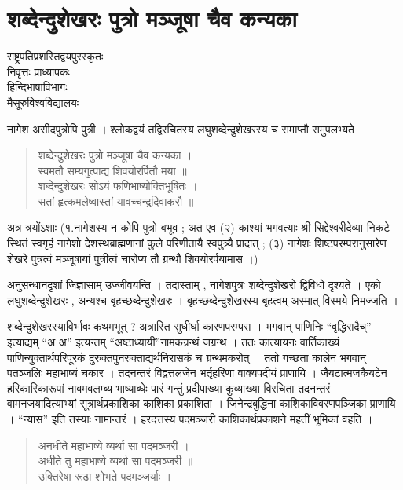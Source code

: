 \chapter{शब्देन्दुशेखरः पुत्रो मञ्जूषा चैव कन्यका}

\begin{center}
\smallskip

राष्ट्रपतिप्रशस्तिद्वयपुरस्कृतः\\
निवृत्तः प्राध्यापकः\\
हिन्दिभाषाविभागः\\
मैसूरुविश्वविद्यालयः
\end{center}

नागेश असीदपुत्रोपि पुत्री । श्लोकद्वयं तद्विरचितस्य लघुशब्देन्दुशेखरस्य च समाप्तौ समुपलभ्यते

\begin{verse}
शब्देन्दुशेखरः पुत्रो मञ्जूषा चैव कन्यका  ।\\
स्वमतौ सम्यगुत्पाद्य शिवयोरर्पितौ मया ॥\\
शब्देन्दुशेखरः सोऽयं फणिभाष्योक्तिभूषितः ।\\
सतां हृत्कमलेष्वास्तां यावच्चन्द्रदिवाकरौ ॥
\end{verse}

अत्र त्रयोंऽशाः (१.नागेशस्य न कोपि पुत्रो बभूव ; अत एव (२) काश्यां भगवत्याः श्री सिद्देश्वरीदेव्या निकटे स्थितं स्वगृहं नागेशो देशस्थब्राह्मणानां कुले परिणीतायै स्वपुत्र्यै प्रादात् ; (३) नागेशः शिष्टपरम्परानुसारेण शेखरे पुत्रत्वं मञ्जूषायां पुत्रीत्वं चारोप्य तौ ग्रन्थौ शिवयोरर्पयामास ।)  

अनुसन्धानदृशां जिज्ञासाम् उज्जीवयन्ति । तदास्ताम् , नागेशपुत्रः शब्देन्दुशेखरो द्विविधो दृश्यते । एको लघुशब्देन्दुशेखरः , अन्यश्च बृहच्छब्देन्दुशेखरः । बृहच्छब्देन्दुशेखरस्य बृहत्वम् अस्मात् विस्मये निमज्जति ।

शब्देन्दुशेखरस्याविर्भावः कथमभूत् ? अत्रास्ति सुधीर्घा कारणपरम्परा । भगवान् पाणिनिः “वृद्धिरादैच्” इत्याद्यम् “अ अ” इत्यन्तम् “अष्टाध्यायी”नामकग्रन्थं जग्रन्थ । ततः कात्यायनः वार्तिकाख्यं पाणिन्युक्तार्थपरिपूरकं दुरुक्तपुनरुक्ताद्यर्थनिरासकं च ग्रन्थमकरोत् । ततो गच्छता कालेन भगवान् पतञ्जलिः महाभाष्यं चकार । तदनन्तरं विद्वत्तलजेन भर्तृहरिणा वाक्यपदीयं प्राणायि । जैयटात्मजकैयटेन हरिकारिकारूपां नावमवलम्ब्य भाष्याब्धेः पारं गन्तुं प्रदीपाख्या कुव्याख्या विरचिता तदनन्तरं वामनजयादित्याभ्यां सूत्रार्थप्रकाशिका काशिका प्रकाशिता । जिनेन्द्रबुद्धिना काशिकाविवरणपञ्जिका प्राणायि । “न्यास” इति तस्याः नामान्तरं । हरदत्तस्य पदमञ्जरी काशिकार्थप्रकाशने महतीं भूमिकां वहति ।

\begin{verse}
अनधीते महाभाष्ये व्यर्था सा पदमञ्जरी ।\\
अधीते तु महाभाष्ये व्यर्था सा पदमञ्जरी ॥\\
उक्तिरेषा रूढा शोभते पदमञ्जर्याः ।
\end{verse}

